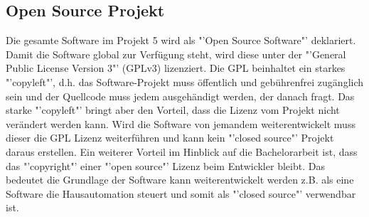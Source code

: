 
\subsection{Open Source Projekt}\label{subsec:OSP}
Die gesamte Software im Projekt 5 wird als "'Open Source Software"' deklariert. Damit die Software global zur Verfügung steht, wird diese unter der "'General Public License Version 3"' (GPLv3) lizenziert. Die GPL beinhaltet ein starkes "'copyleft"', d.h. das Software-Projekt muss öffentlich und gebührenfrei zugänglich sein und der Quellcode muss jedem ausgehändigt werden, der danach fragt. Das starke "'copyleft"' bringt aber den Vorteil, dass die Lizenz vom Projekt nicht verändert werden kann. Wird die Software von jemandem weiterentwickelt muss dieser die GPL Lizenz weiterführen und kann kein "'closed source"' Projekt daraus erstellen. Ein weiterer Vorteil im Hinblick auf die Bachelorarbeit ist, dass das "'copyright"' einer "'open source"' Lizenz beim Entwickler bleibt. Das bedeutet die Grundlage der Software kann weiterentwickelt werden z.B. als eine Software die Hausautomation steuert und somit als "'closed source"' verwendbar ist.\cite{jaeger_was_2018}


